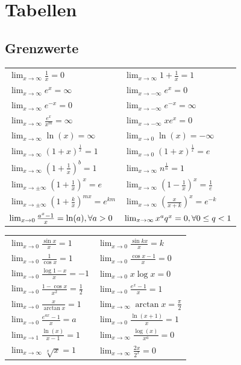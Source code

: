 \documentclass[a4paper,10pt]{article}
\def\limxo{\lim_{x\to 0}}
\def\limxi{\lim_{x\to\infty}}
\def\limxn{\lim_{x\to-\infty}}
\begin{document}
\section{Tabellen}
\subsection{Grenzwerte}
\begin{center}
  \begin{tabularx}{\linewidth}{XX}
    \toprule
    $\limxi \frac{1}{x} = 0$ & $\limxi 1 + \frac{1}{x} = 1$ \\
    $\limxi e^x = \infty$ & $\limxn e^x = 0$ \\
    $\limxi e^{-x} = 0$ & $\limxn e^{-x} = \infty$ \\
    $\limxi \frac{e^x}{x^m} = \infty$ & $\limxn xe^x = 0$ \\
    $\limxi \ln(x) = \infty$ & $\limxo \ln(x) = -\infty$ \\
    $\limxi (1+x)^{\frac{1}{x}} = 1$ & $\limxo (1+x)^{\frac{1}{x}} = e$ \\
    $\limxi (1+\frac{1}{x})^b = 1$ & $\limxi n^{\frac{1}{n}} = 1$ \\
    $\lim_{x\to\pm\infty} (1 + \frac{1}{x})^x = e$ & $\limxi (1-\frac{1}{x})^x = \frac{1}{e}$ \\
    $\lim_{x\to\pm\infty} (1 + \frac{k}{x})^{mx} = e^{km}$ & $\limxi (\frac{x}{x+k})^x = e^{-k}$ \\
    $\limxo \frac{a^x -1}{x} = \ln(a), \newline \forall a > 0$ &
    $\limxi x^a q^x = 0, \newline \forall 0 \le q < 1$ \\
  \end{tabularx}
  \begin{tabularx}{\linewidth}{XX}
    $\limxo \frac{\sin x}{x} = 1$ & $\limxo \frac{\sin kx}{x} = k$\\
    $\limxo \frac{1}{\cos x} = 1$ & $\limxo \frac{\cos x -1}{x} = 0$ \\
    $\limxo \frac{\log 1 - x}{x} = -1$ & $\limxo x \log x = 0$\\
    $\limxo \frac{1 - \cos x}{x^2} = \frac{1}{2}$ & $\limxo \frac{e^x-1}{x} = 1$ \\
    $\limxo \frac{x}{\arctan x} = 1$ & $\limxi \arctan x = \frac{\pi}{2}$ \\
    $\limxo \frac{e^{ax}-1}{x} = a$ & $\limxo \frac{\ln(x+1)}{x} = 1$ \\
    $\lim_{x\to 1} \frac{\ln(x)}{x-1} = 1$ & $\limxi \frac{\log(x)}{x^a} = 0$ \\
    $\limxi \sqrt[x]{x} = 1$ & $\limxi \frac{2x}{2^x} = 0$ \\
    \bottomrule
  \end{tabularx}
\end{center}
\end{document}
